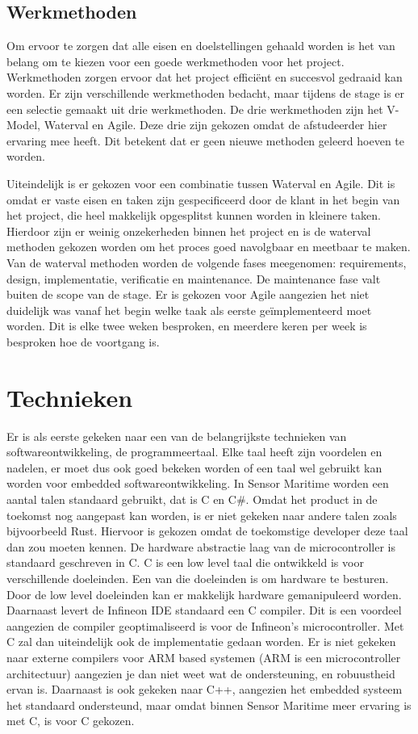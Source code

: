 \subsection{Werkmethoden}
Om ervoor te zorgen dat alle eisen en doelstellingen gehaald worden is het van belang om te kiezen voor een goede werkmethoden voor het project. Werkmethoden zorgen ervoor dat het project efficiënt en succesvol gedraaid kan worden. Er zijn verschillende werkmethoden bedacht, maar tijdens de stage is er een selectie gemaakt uit drie werkmethoden. De drie werkmethoden zijn het V-Model, Waterval en Agile. Deze drie zijn gekozen omdat de afstudeerder hier ervaring mee heeft. Dit betekent dat er geen nieuwe methoden geleerd hoeven te worden. \newline

\noindent Uiteindelijk is er gekozen voor een combinatie tussen Waterval en Agile. Dit is omdat er vaste eisen en taken zijn gespecificeerd door de klant in het begin van het project, die heel makkelijk opgesplitst kunnen worden in kleinere taken. Hierdoor zijn er weinig onzekerheden binnen het project en is de waterval methoden gekozen worden om het proces goed navolgbaar en meetbaar te maken. Van de waterval methoden worden de volgende fases meegenomen: requirements, design, implementatie, verificatie en maintenance. De maintenance fase valt buiten de scope van de stage. Er is gekozen voor Agile aangezien het niet duidelijk was vanaf het begin welke taak als eerste geïmplementeerd moet worden. Dit is elke twee weken besproken, en meerdere keren per week is besproken hoe de voortgang is.




\section{Technieken}
Er is als eerste gekeken naar een van de belangrijkste technieken van softwareontwikkeling, de programmeertaal. Elke taal heeft zijn voordelen en nadelen, er moet dus ook goed bekeken worden of een taal wel gebruikt kan worden voor embedded softwareontwikkeling. In Sensor Maritime worden een aantal talen standaard gebruikt, dat is C en C\#. Omdat het product in de toekomst nog aangepast kan worden, is er niet gekeken naar andere talen zoals bijvoorbeeld Rust. Hiervoor is gekozen omdat de toekomstige developer deze taal dan zou moeten kennen. De hardware abstractie laag van de microcontroller is standaard geschreven in C. C is een low level taal die ontwikkeld is voor verschillende doeleinden. Een van die doeleinden is om hardware te besturen. Door de low level doeleinden kan er makkelijk hardware gemanipuleerd worden. Daarnaast levert de Infineon IDE standaard een C compiler. Dit is een voordeel aangezien de compiler geoptimaliseerd is voor de Infineon's microcontroller. Met C zal dan uiteindelijk ook de implementatie gedaan worden. Er is niet gekeken naar externe compilers voor ARM based systemen (ARM is een microcontroller architectuur) aangezien je dan niet weet wat de ondersteuning, en robuustheid ervan is. Daarnaast is ook gekeken naar C++, aangezien het embedded systeem het standaard ondersteund, maar omdat binnen Sensor Maritime meer ervaring is met C, is voor C gekozen. 

